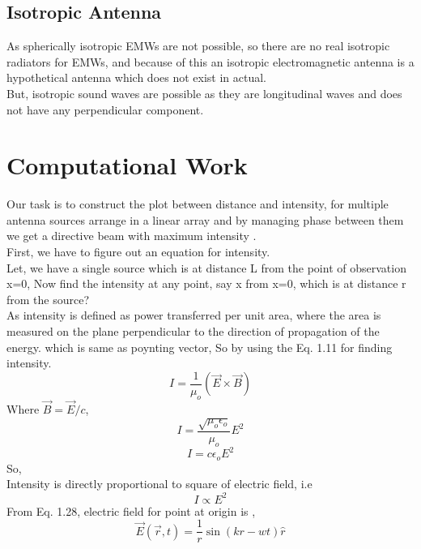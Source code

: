 \subsection{Isotropic Antenna}
As spherically isotropic EMWs are not possible, so there are no real isotropic radiators for EMWs, and because of this an isotropic electromagnetic antenna is a hypothetical antenna which does not exist in actual.\\
But, isotropic sound waves are possible as they are longitudinal waves and does not have any perpendicular component.

\section{Computational Work}
Our task is to construct the plot between distance and intensity, for multiple antenna sources arrange in a linear array and by managing phase between them we get a directive beam with maximum intensity .\\
First, we have to figure out an equation for intensity.\\
Let, we have a single source which is at distance L from the point of observation x=0, Now find the intensity at any point, say x from x=0, which is at distance r from the source?\\
As intensity is defined as power transferred per unit area, where the area is measured on the plane perpendicular to the direction of propagation of the energy. which is same as poynting vector, So by using the Eq. 1.11 for finding intensity.\\
\begin{equation}
I = \frac{1}{\mu_{o}}(\vec{E}\times\vec{B})
\end{equation}
Where $\vec{B} = \vec{E}/c$,\\
\begin{equation}
I = \frac{\sqrt{\mu_{o}{\epsilon_{o}}}}{\mu_{o}}E^2
\end{equation}
\begin{equation}
I = c\epsilon_{o}E^2
\end{equation}
So,\\
Intensity is directly proportional to square of electric field, i.e\\
\begin{equation}
I \propto E^2
\end{equation}
From Eq. 1.28, electric field for point at origin is ,\\
\begin{equation}
\vec{E}(\vec{r},t) = \frac{1}{r}\sin(kr-wt)\hat{r}
\end{equation}
